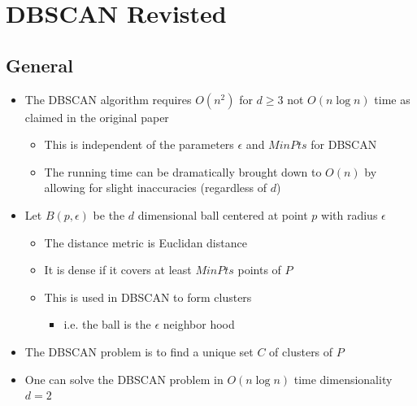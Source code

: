 \documentclass[11pt]{article}
\begin{document}
\section{DBSCAN Revisted}
\label{sec:org874adef}
\subsection{General}
\label{sec:org7d48d77}
\begin{itemize}
\item The DBSCAN algorithm requires \(O(n^2)\) for \(d \geq 3\) not \(O(n \log n)\) time as claimed in the original paper
\begin{itemize}
\item This is independent of the parameters \(\epsilon\) and \(MinPts\) for DBSCAN
\item The running time can be dramatically brought down to \(O(n)\) by allowing for slight inaccuracies (regardless of \(d\))
\end{itemize}

\item Let \(B(p, \epsilon)\) be the \(d\) dimensional ball centered at point \(p\) with radius \(\epsilon\)
\begin{itemize}
\item The distance metric is Euclidan distance
\item It is dense if it covers at least \(MinPts\) points of \(P\)
\item This is used in DBSCAN to form clusters
\begin{itemize}
\item i.e. the ball is the \(\epsilon\) neighbor hood
\end{itemize}
\end{itemize}

\item The DBSCAN problem is to find a unique set \(C\) of clusters of \(P\)

\item One can solve the DBSCAN problem in \(O(n \log n)\) time dimensionality \(d=2\)
\end{itemize}
\end{document}
